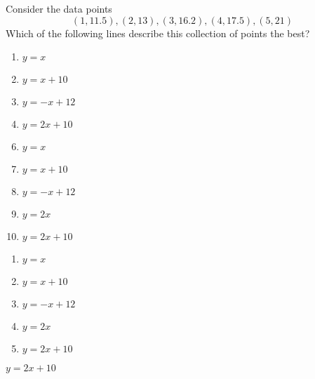 


  Consider the data points \[(1,11.5),(2,13), (3,16.2),(4,17.5),(5,21)\]  Which of the following lines describe this collection of points the best?


\ifsat
	\begin{enumerate}[label=\Alph*)]
		\item    $y=x$
		\item    $y=x+10$ 
		\item  $y=-x+12$
		\item  $y=2x+10$ %
	\end{enumerate}
\else
\fi

\ifacteven
	\begin{enumerate}[label=\textbf{\Alph*.},itemsep=\fill,align=left]
		\setcounter{enumii}{5}
		\item    $y=x$
		\item    $y=x+10$ 
		\item  $y=-x+12$
		\addtocounter{enumii}{1}
		\item  $y=2x$
		\item  $y=2x+10$ %
	\end{enumerate}
\else
\fi

\ifactodd
	\begin{enumerate}[label=\textbf{\Alph*.},itemsep=\fill,align=left]
		\item    $y=x$
		\item    $y=x+10$ 
		\item  $y=-x+12$
		\item  $y=2x$
		\item  $y=2x+10$ %
	\end{enumerate}
\else
\fi

\ifgridin
  $y=2x+10$ %

\else
\fi

